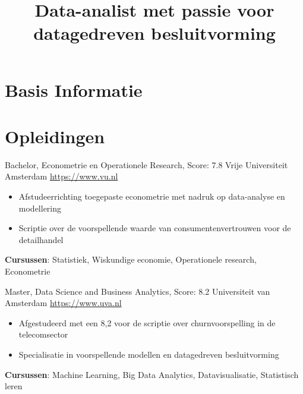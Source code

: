 \documentclass[a4paper, serif, 10pt]{moderncv}
\title{Data-analist met passie voor datagedreven besluitvorming}
\begin{document}
\maketitle

\section{Basis Informatie}

\section{Opleidingen}

        {Bachelor, Econometrie en Operationele Research, Score: 7.8}
        {Vrije Universiteit Amsterdam}
        {\url{https://www.vu.nl}}
        {}
        {\begin{itemize}
\item Afstudeerrichting toegepaste econometrie met nadruk op data-analyse en modellering
\item Scriptie over de voorspellende waarde van consumentenvertrouwen voor de detailhandel
\end{itemize}
\textbf{Cursussen}: Statistiek, Wiskundige economie, Operationele research, Econometrie}

        {Master, Data Science and Business Analytics, Score: 8.2}
        {Universiteit van Amsterdam}
        {\url{https://www.uva.nl}}
        {}
        {\begin{itemize}
\item Afgestudeerd met een 8,2 voor de scriptie over churnvoorspelling in de telecomsector
\item Specialisatie in voorspellende modellen en datagedreven besluitvorming
\end{itemize}
\textbf{Cursussen}: Machine Learning, Big Data Analytics, Datavisualisatie, Statistisch leren}
\end{document}
